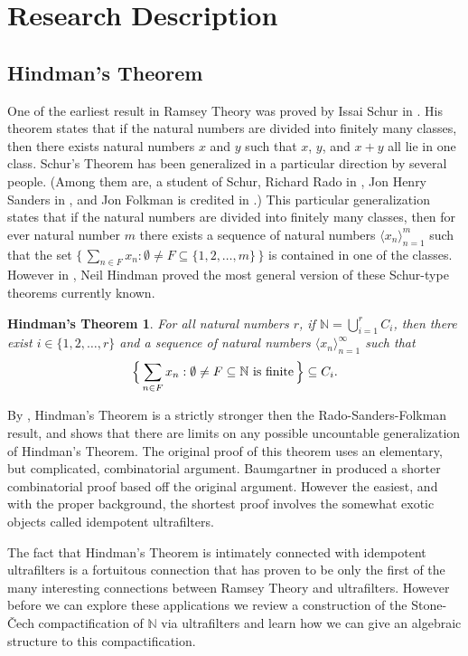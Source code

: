 \documentclass[12pt]{article}
\theoremstyle{plain}
\newtheorem{fst}[thm]{Hindman's Theorem}
\theoremstyle{definition}
\newcommand{\bbN}{\mathbb{N}}
\newcommand{\la}{\langle}
\newcommand{\ra}{\rangle}
\begin{document}
\section{Research Description}
\subsection{Hindman's Theorem}
One of the earliest result in Ramsey Theory was proved by Issai Schur
in \cite{Schur:1916fk}.
His theorem states that if the natural numbers are divided into
finitely many classes, then there exists natural numbers $x$ and $y$
such that $x$, $y$, and $x+y$ all lie in one class.
Schur's Theorem has been generalized in a particular direction by
several people.
(Among them are, a student of Schur, Richard Rado in
\cite{Rado:1933kx}, Jon Henry Sanders in \cite{Sanders:1968uq}, and
Jon Folkman is credited in \cite{Graham:1971vn}.)
This particular generalization states that if the natural numbers are
divided into finitely many classes, then for ever natural number $m$
there exists a sequence of natural numbers $\la x_n \ra_{n=1}^m$ such
that the set $\{\, \sum_{n \in F} x_n : \emptyset \ne F \subseteq \{1,
2, \ldots, m\} \,\}$ is contained in one of the classes.
However in \cite{Hindman:1974ys}, Neil Hindman proved the most general
version of these Schur-type theorems currently known. 

  \begin{fst}
    For all natural numbers $r$, if \/ $\bbN = \bigcup_{i=1}^r C_i$, then
    there exist $i \in \{1, 2, \ldots, r\}$ and a sequence of natural
    numbers $\la x_n \ra_{n=1}^\infty$ such that
      \[
        \Bigl\{\, \sum_{n\in F} x_n : \emptyset \ne F \subseteq \bbN
        \hbox{ is finite} \,\Bigr\} \subseteq C_i.
      \]
  \end{fst}

By \cite[Theorems 16.28 and 16.29]{Hindman:1998fk}, Hindman's Theorem
is a strictly stronger then the Rado-Sanders-Folkman result, and
\cite{Milliken:1978fk} shows that there are limits on any possible
uncountable generalization of Hindman's Theorem.
The original proof of this theorem uses an elementary, but
complicated, combinatorial argument. 
Baumgartner in \cite{Baumgartner:1974uq} produced a shorter
combinatorial proof based off the original argument. 
However the easiest, and with the proper background, the shortest
proof involves the somewhat exotic objects called idempotent
ultrafilters. 

The fact that Hindman's Theorem is intimately connected with
idempotent ultrafilters is a fortuitous connection that has proven to
be only the first of the many interesting connections between Ramsey
Theory and ultrafilters.
However before we can explore these applications we review a
construction of the Stone-\v{C}ech compactification of $\bbN$ via
ultrafilters and learn how we can give an algebraic structure to this
compactification.
\end{document}
